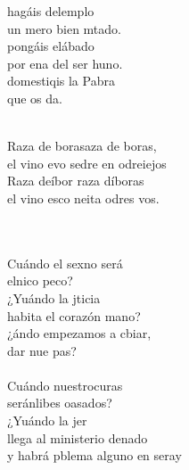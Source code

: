 \begin{cancion}%
	 hagáis delemplo\\
	un mero bien mtado.\\
	 pongáis elábado\\
	por ena del ser huno.\\
	 domestiqis la Pabra \\
	que os da.\\\jump\\
	\begin{chorus}%
	Raza de borasaza de boras, \\
	el vino evo sedre en odreiejos\\
	Raza deíbor raza díboras\\
	el vino esco neita odres vos.\\
	\end{chorus}%
	\jump\\
	    \\
	Cuándo el sexno será\\
	elnico peco?\\
	¿Yuándo la jticia \\
	habita el corazón mano?\\
	¿ándo empezamos a cbiar,\\
	dar nue pas?\\
\jump\\
	Cuándo nuestrocuras\\
	seránlibes oasados? \\
	¿Yuándo la jer \\
	llega al ministerio denado\\
	y  habrá pblema alguno en seray\\

\end{cancion}
